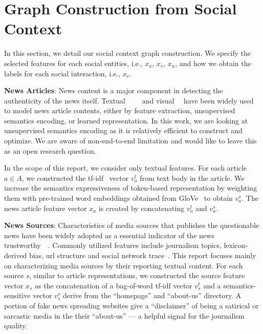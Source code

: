 \documentclass[fyp]{socreport}
\theoremstyle{definition}
\theoremstyle{hypothesis}
\begin{document}
\section{Graph Construction from Social Context}
\label{sec:graph}
In this section, 
we detail our social context graph construction. We specify the selected features for each social entities, i.e., $x_a$, $x_s$, $x_u$, and how we obtain the labels for each social interaction, i.e., $x_e$.

\textbf{News Articles}: News content is a major component in detecting the authenticity of the news itself. Textual~\cite{castillo2011information}~\cite{yang2012automatic}~\cite{shu2019beyond}~\cite{popat2018credeye} and visual~\cite{wang2018eann}~\cite{khattar2019mvae} have been widely used to model news article contents, either by feature extraction, unsupervised semantics encoding, or learned representation. In this work, we are looking at unsupervised semantics encoding as it is relatively efficient to construct and optimize. We are aware of non-end-to-end limitation and would like to leave this as an open research question.

In the scope of this report, we consider only textual features. For each article $a\in A$, we constructed the tf-idf~\cite{sparck2004idf} vector $v^t_a$ from text body in the article. We increase the semantics expressiveness of token-based representation by weighting them with pre-trained word embeddings obtained from GloVe~\cite{pennington2014glove} to obtain $v^s_a$. The news article feature vector $x_a$ is created by concatenating $v^t_a$ and $v^s_a$.

\textbf{News Sources}: Characteristics of media sources that publishes the questionable news have been widely adopted as a essential indicator of the news trustworthy~\cite{baly2018predicting}~\cite{kulkarni2018multi}. Commonly utilized features include journalism topics, lexicon-derived bias, url structure and social network trace~\cite{baly2018predicting}. This report focuses mainly on characterizing media sources by their reporting textual content. For each source $s$, similar to article representations, we constructed the source feature vector $x_s$ 
as the concatenation of a bag-of-word tf-idf vector $v^t_s$ and a semantics-sensitive vector $v^s_s$ derive from the ``homepage'' and ``about-us'' directory. A portion of fake news spreading websites give a ``disclaimer'' of being a satirical or sarcastic media in the their ``about-us'' --- a helpful signal for the journalism quality. 
\end{document}
